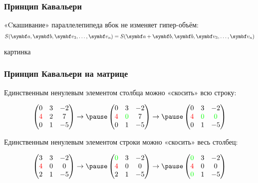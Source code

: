 \begin{frame}
\frametitle{Принцип Кавальери}

        «Cкашивание» параллелепипеда вбок не изменяет гипер-объём:
        \[
            S(\ba, \bb, \bv_3, \ldots, \bv_n) = S(\ba + \bb, \bb, \bv_3, \ldots, \bv_n)
        \]


        картинка

\end{frame}



\begin{frame}
    \frametitle{Принцип Кавальери на матрице}
    
    Единственным ненулевым элементом столбца можно «скосить» всю строку:

    \[
    \begin{pmatrix}
        0 & 3 & -2 \\
        \textcolor{red}{4} & 2 & 7 \\
        0 & 1 & -5 \\
    \end{pmatrix} \to  \pause 
\begin{pmatrix}
    0 & 3 & -2 \\
    \textcolor{red}{4} & \textcolor{green}{0} & 7 \\
    0 & 1 & -5 \\
\end{pmatrix}  \to \pause 
\begin{pmatrix}
    0 & 3 & -2 \\
    \textcolor{red}{4} & \textcolor{green}{0} & \textcolor{green}{0} \\
    0 & 1 & -5 \\
\end{pmatrix}  
    \]

    \pause
    Единственным ненулевым элементом строки можно «скосить» весь столбец:
    
    \[
    \begin{pmatrix}
        3 & 3 & -2 \\
        \textcolor{red}{4} & 0 & 0 \\
        2 & 1 & -5 \\
    \end{pmatrix} \to  \pause 
\begin{pmatrix}
    \textcolor{green}{0} & 3 & -2 \\
\textcolor{red}{4} & 0 & 0 \\
2 & 1 & -5 \\
\end{pmatrix}  \to \pause 
\begin{pmatrix}
    \textcolor{green}{0} & 3 & -2 \\
\textcolor{red}{4} & 0 & 0 \\
\textcolor{green}{0} & 1 & -5 \\
\end{pmatrix}  
    \]
    
\end{frame}


